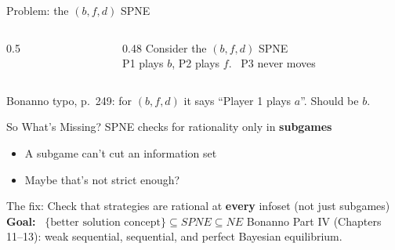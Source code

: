 \begin{frame}{Problem: the $(b,f,d)$ SPNE}
\begin{columns}[c]
\begin{column}{0.5\textwidth}
\centering
\horse
\end{column}
\begin{column}{0.48\textwidth}
Consider the $(b,f,d)$ SPNE\\[4pt]
P1 plays $b$, P2 plays $f$. \ P3 never moves
\bsk
{}
\bsk
{}
\end{column}
\end{columns}
\bsk
{}
\vfill
{\footnotesize Bonanno typo, p.~249: for $(b,f,d)$ it says ``Player 1 plays $a$''. Should be $b$.}
\vspace{-0.2in}
\end{frame}

\begin{frame}{So What's Missing?}
SPNE checks for rationality only in \textbf{subgames}
\begin{itemize}
    \item A subgame can't cut an information set
    \item Maybe that's not strict enough?
\end{itemize}
\bsk
The fix: Check that strategies are rational at \textbf{every} infoset (not just subgames)
\bsk
\textbf{Goal:} \ $\{\text{better solution concept}\}\subseteq SPNE\subseteq NE$
\vfill
{\footnotesize Bonanno Part IV (Chapters 11--13): weak sequential, sequential, and perfect Bayesian equilibrium.}
\vspace{-0.2in}
\end{frame}

